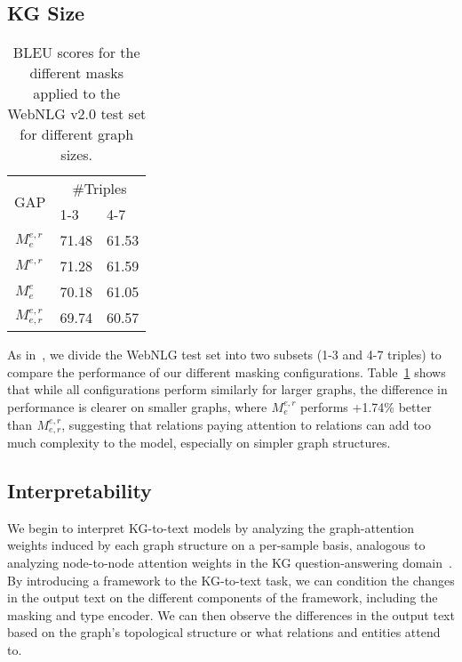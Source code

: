 \documentclass[11pt]{article}
\begin{document}
\subsection{KG Size}
\begin{table}[]
\centering
\begin{tabular}{lll}
\hline
\multicolumn{1}{c}{\multirow{2}{*}{GAP}} & \multicolumn{2}{c}{\#Triples} \\ \cline{2-3} 
\multicolumn{1}{c}{}                        & 1-3           & 4-7           \\ \hline
$ {}^{}_{}M^{e,r}_{e} $                                           & 71.48         & 61.53         \\ \hline
$ {}^{}_{}M^{e,r}_{} $                                          & 71.28         & 61.59         \\ \hline
$ {}^{}_{}M^{e}_{e} $                                          & 70.18         & 61.05         \\ \hline
$ {}^{}_{}M^{e,r}_{e,r} $                                         & 69.74         & 60.57         \\ \hline
\end{tabular}
\caption{\label{tab:sizewebnlg} BLEU scores for the different masks applied to the WebNLG v2.0 test set for different graph sizes.}
\end{table}
As in~\citet{ke-etal-2021-jointgt}, we divide the WebNLG test set into two subsets (1-3 and 4-7 triples) to compare the performance of our different masking configurations. Table~\ref{tab:sizewebnlg} shows that while all configurations perform similarly for larger graphs, the difference in performance is clearer on smaller graphs, where $ {}^{}_{}M^{e,r}_{e} $ performs +1.74\% better than $ {}^{}_{}M^{e,r}_{e,r} $, suggesting that relations paying attention to relations can add too much complexity to the model, especially on simpler graph structures.

\subsection{Interpretability}
We begin to interpret KG-to-text models by analyzing the graph-attention weights induced by each graph structure on a per-sample basis, analogous to analyzing node-to-node attention weights in the KG question-answering domain~\cite{yasunaga2021qa}. By introducing a framework to the KG-to-text task, we can condition the changes in the output text on the different components of the framework, including the masking and type encoder. We can then observe the differences in the output text based on the graph's topological structure or what relations and entities attend to.
\end{document}
